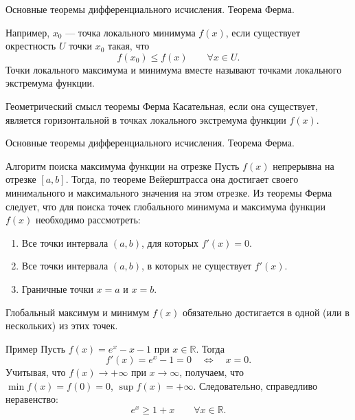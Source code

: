 \documentclass[8pt]{beamer}
\begin{document}
\begin{frame}{Основные теоремы дифференциального исчисления. Теорема Ферма.}
Например, $x_0$ --- точка локального минимума $f(x)$, если существует окрестность $U$ точки $x_0$ такая, что
$$f(x_0)\le f(x) \qquad \forall x\in U.$$
Точки локального максимума и минимума вместе называют точками локального экстремума функции.

\begin{block}{Геометрический смысл теоремы Ферма}
Касательная, если она существует,  является горизонтальной в точках локального экстремума функции $f(x)$.
\end{block} 
\end{frame}

\begin{frame}{Основные теоремы дифференциального исчисления. Теорема Ферма.}
\begin{block}{Алгоритм поиска максимума функции на отрезке}
Пусть $f(x)$ непрерывна на отрезке $[a,b]$. Тогда, по теореме Вейерштрасса она достигает своего минимального и максимального значения на этом отрезке. Из теоремы Ферма следует, что для поиска точек глобального минимума и максимума функции $f(x)$ необходимо рассмотреть:
\begin{enumerate}
\item Все точки интервала $(a,b)$, для которых $f'(x)=0$.
\item Все точки интервала $(a,b)$, в которых не существует $f'(x)$.
\item Граничные точки $x=a$ и $x=b$.
\end{enumerate}
Глобальный максимум и минимум $f(x)$ обязательно достигается в одной (или в нескольких) из этих точек.
\end{block} 
\begin{block}{Пример}
Пусть $f(x)=e^x-x-1$ при $x\in\mathbb{R}$. Тогда
$$f'(x) =e^x -1=0\quad \Leftrightarrow \quad x=0.$$
Учитывая, что $f(x)\to+\infty$ при $x\to\infty$, получаем, что $\min f(x) = f(0)=0$, $\sup f(x) =+\infty$.
Следовательно, справедливо неравенство:
$$e^x\ge 1+x \qquad \forall x\in\mathbb{R}.$$
\end{block}
\end{frame}
\end{document}
